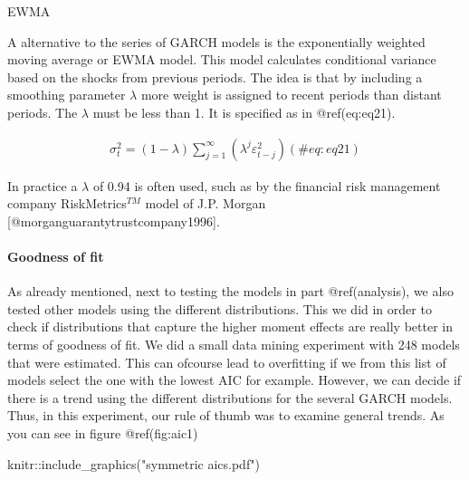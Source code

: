 \documentclass[
]{article}
\newenvironment{Shaded}{\begin{snugshade}}{\end{snugshade}}
\newcommand{\FunctionTok}[1]{\textcolor[rgb]{0.00,0.00,0.00}{#1}}
\newcommand{\NormalTok}[1]{#1}
\newcommand{\SpecialCharTok}[1]{\textcolor[rgb]{0.00,0.00,0.00}{#1}}
\newcommand{\StringTok}[1]{\textcolor[rgb]{0.31,0.60,0.02}{#1}}
\begin{document}
EWMA

\noindent A alternative to the series of GARCH models is the
exponentially weighted moving average or EWMA model. This model
calculates conditional variance based on the shocks from previous
periods. The idea is that by including a smoothing parameter \(\lambda\)
more weight is assigned to recent periods than distant periods. The
\(\lambda\) must be less than 1. It is specified as in @ref(eq:eq21).

\begin{align}
\sigma_t^2 = (1-\lambda) \sum\limits_{j=1}^\infty (\lambda^j \varepsilon_{t-j}^2)
 (\#eq:eq21)
\end{align}

In practice a \(\lambda\) of 0.94 is often used, such as by the
financial risk management company RiskMetrics\(^{TM}\) model of J.P.
Morgan {[}@morganguarantytrustcompany1996{]}.

\newpage

\hypertarget{goodness-of-fit}{%
\paragraph{Goodness of fit}\label{goodness-of-fit}}

As already mentioned, next to testing the models in part @ref(analysis),
we also tested other models using the different distributions. This we
did in order to check if distributions that capture the higher moment
effects are really better in terms of goodness of fit. We did a small
data mining experiment with 248 models that were estimated. This can
ofcourse lead to overfitting if we from this list of models select the
one with the lowest AIC for example. However, we can decide if there is
a trend using the different distributions for the several GARCH models.
Thus, in this experiment, our rule of thumb was to examine general
trends. As you can see in figure @ref(fig:aic1)

\begin{Shaded}
\begin{Highlighting}[]
\NormalTok{knitr}\SpecialCharTok{::}\FunctionTok{include\_graphics}\NormalTok{(}\StringTok{"symmetric aics.pdf"}\NormalTok{)}
\end{Highlighting}
\end{Shaded}
\end{document}
